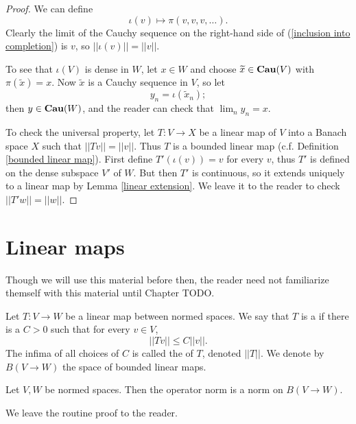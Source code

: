 \begin{proof}
We can define
\begin{equation}
\label{inclusion into completion}
\iota(v) \mapsto \pi(v, v, v, \dots).
\end{equation}
Clearly the limit of the Cauchy sequence on the right-hand side of (\ref{inclusion into completion}) is $v$, so $||\iota(v)|| = ||v||$.

To see that $\iota(V)$ is dense in $W$, let $x \in W$ and choose $\widetilde x \in \mathbf{Cau} (V)$ with $\pi(\widetilde x) = x$.
Now $\widetilde x$ is a Cauchy sequence in $V$, so let
$$y_n = \iota(\widetilde x_n);$$
then $y \in \mathbf{Cau} (W)$, and the reader can check that $\lim_n y_n = x$.

To check the universal property, let $T: V \to X$ be a linear map of $V$ into a Banach space $X$ such that $||Tv|| = ||v||$.
Thus $T$ is a bounded linear map (c.f. Definition \ref{bounded linear map}). First define $T'(\iota(v)) = v$ for every $v$, thus $T'$ is defined on the dense subspace $V'$ of $W$.
But then $T'$ is continuous, so it extends uniquely to a linear map by Lemma \ref{linear extension}. We leave it to the reader to check $||T'w|| = ||w||$.
\end{proof}

\section{Linear maps}
Though we will use this material before then, the reader need not familiarize themself with this material until Chapter TODO.
\begin{definition}
\label{bounded linear map}
Let $T: V\to W$ be a linear map between normed spaces. We say that $T$ is a  if there is a $C>0$ such that for every $v \in V$,
$$||Tv|| \leq C||v||.$$
The infima of all choices of $C$ is called the  of $T$, denoted $||T||$.
We denote by $B(V \to W)$ the space of bounded linear maps.
\end{definition}

\begin{lemma}
Let $V,W$ be normed spaces.
Then the operator norm is a norm on $B(V \to W)$.
\end{lemma}
We leave the routine proof to the reader.

